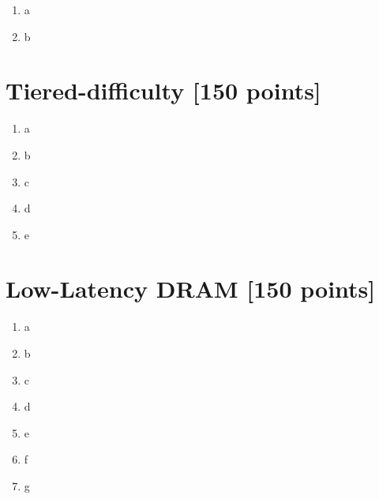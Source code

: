\documentclass[a4paper]{article}
\begin{document}
\begin{enumerate}[label=\alph*)]
    \item a
    \item b
\end{enumerate}

\section{Tiered-difficulty [150 points]}

\begin{enumerate}[label=\alph*)]
    \item a
    \item b
    \item c
    \item d
    \item e
\end{enumerate}

\section{Low-Latency DRAM [150 points]}

\begin{enumerate}[label=\alph*)]
    \item a
    \item b
    \item c
    \item d
    \item e
    \item f
    \item g
\end{enumerate}
\end{document}
